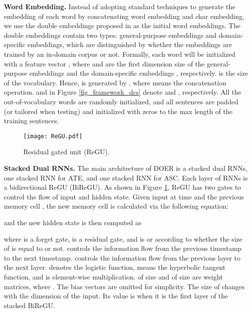 \documentclass[11pt,a4paper]{article}
\begin{document}
	\vspace{+1.5mm}
	\noindent
	\textbf{Word Embedding.} \quad Instead of adopting standard techniques to generate the embedding of each word  by concatenating word embedding and char embedding, we use the double embeddings proposed in \cite{Xu2018} as the initial word embeddings. The double embeddings contain two types: general-purpose embeddings and domain-specific embeddings, which are distinguished by whether the embeddings are trained by an in-domain corpus or not. Formally, each word  will be initialized with a feature vector , where  and  are the first dimension size of the general-purpose embeddings  and the domain-specific embeddings , respectively.  is the size of the vocabulary. Hence,  is generated by , where  means the concatenation operation.  and  in Figure \ref{fig_framework_dcs} denote  and , respectively. All the out-of-vocabulary words are randomly initialized, and all sentences are padded (or tailored when testing) and initialized with zeros to the max length of the training sentences.
	\begin{figure}[htbp]
		\centering
		\texttt{[image: ReGU.pdf]}
		\caption{Residual gated unit (ReGU).}\label{fig_regu}
	\end{figure}

	\vspace{+1.5mm}
	\noindent
	\textbf{Stacked Dual RNNs.} \quad The main architecture of DOER is a stacked dual RNNs, one stacked RNN for ATE, and one stacked RNN for ASC. Each layer of RNNs is a bidirectional ReGU (BiReGU). As shown in Figure \ref{fig_regu}, ReGU has two gates to control the flow of input and hidden state. Given input  at time  and the previous memory cell , the new memory cell  is calculated via the following equation:
	
	and the new hidden state  is then computed as
	
	where  is a forget gate,  is a residual gate, and  is  or  according to whether the size of  is equal to  or not.  controls the information flow from the previous timestamp to the next timestamp.  controls the information flow from the previous layer to the next layer.  denotes the logistic function,  means the hyperbolic tangent function, and  is element-wise multiplication.  of size  and  of size  are weight matrices, where . The bias vectors are omitted for simplicity. The size of  changes with the dimension of the input. Its value is  when it is the first layer of the stacked BiReGU.
	
\end{document}
